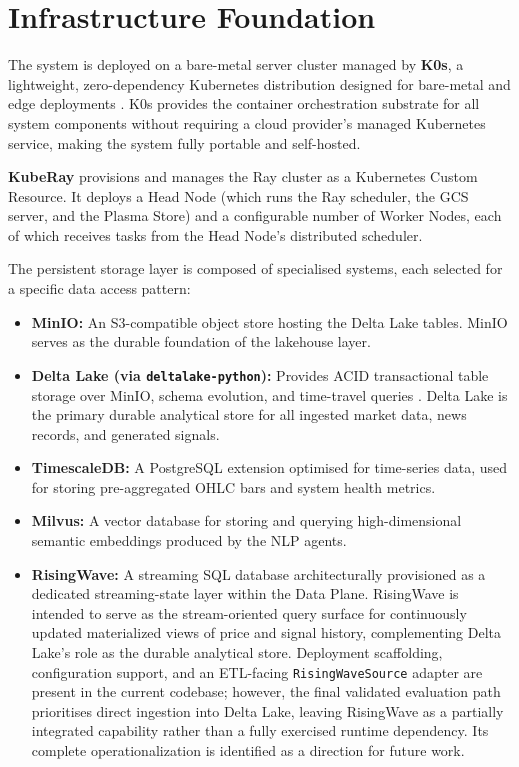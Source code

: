\documentclass[12pt, a4paper]{report}
\begin{document}
\section{Infrastructure Foundation}
\label{sec:infrastructure}

The system is deployed on a bare-metal server cluster managed by \textbf{K0s}, a
lightweight, zero-dependency Kubernetes distribution designed for bare-metal and edge
deployments \citep{k0s2021}.
K0s provides the container orchestration substrate for all system components without
requiring a cloud provider's managed Kubernetes service, making the system fully
portable and self-hosted.

\textbf{KubeRay} provisions and manages the Ray cluster as a Kubernetes Custom Resource.
It deploys a Head Node (which runs the Ray scheduler, the GCS server, and the Plasma
Store) and a configurable number of Worker Nodes, each of which receives tasks from the
Head Node's distributed scheduler.

The persistent storage layer is composed of specialised systems, each selected for a
specific data access pattern:
\begin{itemize}
  \item \textbf{MinIO:} An S3-compatible object store hosting the Delta Lake tables.
  MinIO serves as the durable foundation of the lakehouse layer.
  \item \textbf{Delta Lake (via \texttt{deltalake-python}):} Provides ACID transactional
  table storage over MinIO, schema evolution, and time-travel queries
  \citep{armbrust2020delta}. Delta Lake is the primary durable analytical store for
  all ingested market data, news records, and generated signals.
  \item \textbf{TimescaleDB:} A PostgreSQL extension optimised for time-series data,
  used for storing pre-aggregated OHLC bars and system health metrics.
  \item \textbf{Milvus:} A vector database for storing and querying high-dimensional
  semantic embeddings produced by the NLP agents.
  \item \textbf{RisingWave:} A streaming SQL database architecturally provisioned as
  a dedicated streaming-state layer within the Data Plane. RisingWave is intended to
  serve as the stream-oriented query surface for continuously updated materialized
  views of price and signal history, complementing Delta Lake's role as the durable
  analytical store. Deployment scaffolding, configuration support, and an ETL-facing
  \texttt{RisingWaveSource} adapter are present in the current codebase; however,
  the final validated evaluation path prioritises direct ingestion into Delta Lake,
  leaving RisingWave as a partially integrated capability rather than a fully
  exercised runtime dependency. Its complete operationalization is identified as a
  direction for future work.
\end{itemize}
\end{document}
